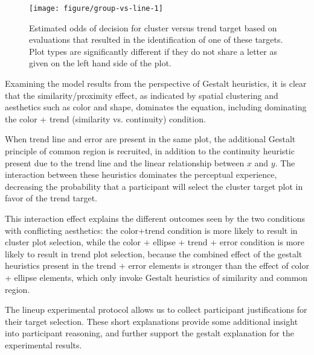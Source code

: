 \documentclass[12pt]{article}\usepackage[]{graphicx}\usepackage[]{color}
\newenvironment{knitrout}{}{} %
\begin{document}
\begin{figure}[ht]\centering
\begin{knitrout}
\color{fgcolor}

{\centering \texttt{[image: figure/group-vs-line-1]} 

}



\end{knitrout}
\caption[Estimated odds of decision for cluster versus trend target]{\label{fig:faceoff} Estimated odds of decision for cluster versus trend target based on evaluations that resulted in the identification of one of these targets. Plot types are significantly different if they do not share a letter as given on the left hand side of the plot.}
\end{figure}

Examining the model results from the perspective of Gestalt heuristics, it is clear that the similarity/proximity effect, as indicated by spatial clustering and aesthetics such as color and shape, dominates the equation, including dominating the color + trend (similarity vs. continuity) condition. 

When trend line and error are present in the same plot, the additional Gestalt principle of common region is recruited, in addition to the continuity heuristic present due to the trend line and the linear relationship between $x$ and $y$. The interaction between these heuristics dominates the perceptual experience, decreasing the probability that a participant will select the cluster target plot in favor of the trend target. 

This interaction effect explains the different outcomes seen by the two conditions with conflicting aesthetics: the color+trend condition is more likely to result in cluster plot selection, while the color + ellipse + trend + error condition is more likely to result in trend plot selection, because the combined effect of the gestalt heuristics present in the trend + error elements is stronger than the effect of color + ellipse elements, which only invoke Gestalt heuristics of similarity and common region. 

The lineup experimental protocol allows us to collect participant justifications for their target selection. These short explanations provide some additional insight into participant reasoning, and further support the gestalt explanation for the experimental results. 
\end{document}
